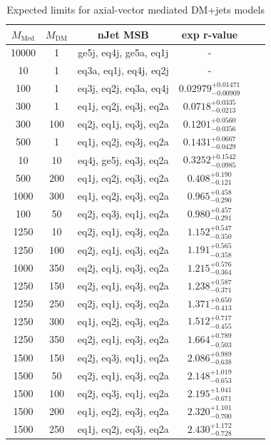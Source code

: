 \begin{table}
  \centering
  \begin{tabular}{cccccc}
    \hline\hline
    $M_{\text{Med}}$ & $M_{\text{DM}}$ & nJet MSB & exp r-value \\
    \hline
    10000 & 1 & ge5j, eq4j, ge5a, eq1j & - \\
    10 & 1 & eq3a, eq1j, eq4j, eq2j & - \\
    100 & 1 & eq3j, eq2j, eq3a, eq4j & $0.02979_{-0.00909}^{+0.01471}$ \\
    300 & 1 & eq1j, eq2j, eq3j, eq2a & $0.0718_{-0.0213}^{+0.0335}$ \\
    300 & 100 & eq2j, eq1j, eq3j, eq2a & $0.1201_{-0.0356}^{+0.0560}$ \\
    500 & 1 & eq1j, eq2j, eq3j, eq2a & $0.1431_{-0.0429}^{+0.0667}$ \\
    10 & 10 & eq4j, ge5j, eq3j, eq2a & $0.3252_{-0.0985}^{+0.1542}$ \\
    500 & 200 & eq1j, eq2j, eq3j, eq2a & $0.408_{-0.121}^{+0.190}$ \\
    1000 & 300 & eq1j, eq2j, eq3j, eq2a & $0.965_{-0.290}^{+0.458}$ \\
    100 & 50 & eq2j, eq3j, eq1j, eq2a & $0.980_{-0.291}^{+0.457}$ \\
    1250 & 10 & eq2j, eq1j, eq3j, eq2a & $1.152_{-0.350}^{+0.547}$ \\
    1250 & 100 & eq2j, eq1j, eq3j, eq2a & $1.191_{-0.358}^{+0.565}$ \\
    1000 & 350 & eq2j, eq1j, eq3j, eq2a & $1.215_{-0.364}^{+0.576}$ \\
    1250 & 150 & eq2j, eq1j, eq3j, eq2a & $1.238_{-0.371}^{+0.587}$ \\
    1250 & 250 & eq2j, eq1j, eq3j, eq2a & $1.371_{-0.413}^{+0.650}$ \\
    1250 & 300 & eq1j, eq2j, eq3j, eq2a & $1.512_{-0.455}^{+0.717}$ \\
    1250 & 350 & eq2j, eq1j, eq3j, eq2a & $1.664_{-0.503}^{+0.789}$ \\
    1500 & 150 & eq2j, eq3j, eq1j, eq2a & $2.086_{-0.638}^{+0.989}$ \\
    1500 & 50 & eq2j, eq1j, eq3j, eq2a & $2.148_{-0.653}^{+1.019}$ \\
    1500 & 100 & eq2j, eq3j, eq1j, eq2a & $2.195_{-0.671}^{+1.041}$ \\
    1500 & 200 & eq1j, eq2j, eq3j, eq2a & $2.320_{-0.700}^{+1.101}$ \\
    1500 & 250 & eq1j, eq2j, eq3j, eq2a & $2.430_{-0.728}^{+1.172}$ \\
    \hline\hline
  \end{tabular}
  \caption{Expected limits for axial-vector mediated DM+jets models}
  \label{tab:DMA_exp}
\end{table}


